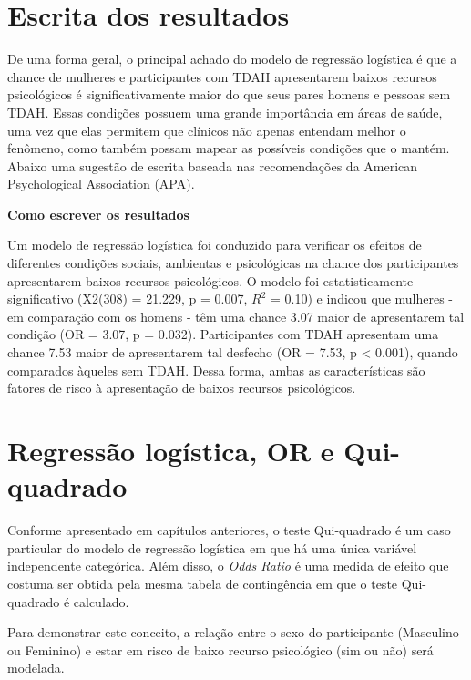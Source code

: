 \documentclass[
]{book}
\begin{document}
\hypertarget{escrita-dos-resultados-15}{%
\section{Escrita dos resultados}\label{escrita-dos-resultados-15}}

De uma forma geral, o principal achado do modelo de regressão logística é que a chance de mulheres e participantes com TDAH apresentarem baixos recursos psicológicos é significativamente maior do que seus pares homens e pessoas sem TDAH. Essas condições possuem uma grande importância em áreas de saúde, uma vez que elas permitem que clínicos não apenas entendam melhor o fenômeno, como também possam mapear as possíveis condições que o mantém. Abaixo uma sugestão de escrita baseada nas recomendações da American Psychological Association (APA).

\textbf{Como escrever os resultados}

Um modelo de regressão logística foi conduzido para verificar os efeitos de diferentes condições sociais, ambientas e psicológicas na chance dos participantes apresentarem baixos recursos psicológicos. O modelo foi estatisticamente significativo (X2(308) = 21.229, p = 0.007, \(R^2\) = 0.10) e indicou que mulheres - em comparação com os homens - têm uma chance 3.07 maior de apresentarem tal condição (OR = 3.07, p = 0.032). Participantes com TDAH apresentam uma chance 7.53 maior de apresentarem tal desfecho (OR = 7.53, p \textless{} 0.001), quando comparados àqueles sem TDAH. Dessa forma, ambas as características são fatores de risco à apresentação de baixos recursos psicológicos.

\hypertarget{regressuxe3o-loguxedstica-or-e-qui-quadrado}{%
\section{Regressão logística, OR e Qui-quadrado}\label{regressuxe3o-loguxedstica-or-e-qui-quadrado}}

Conforme apresentado em capítulos anteriores, o teste Qui-quadrado é um caso particular do modelo de regressão logística em que há uma única variável independente categórica. Além disso, o \emph{Odds Ratio} é uma medida de efeito que costuma ser obtida pela mesma tabela de contingência em que o teste Qui-quadrado é calculado.

Para demonstrar este conceito, a relação entre o sexo do participante (Masculino ou Feminino) e estar em risco de baixo recurso psicológico (sim ou não) será modelada.
\end{document}
